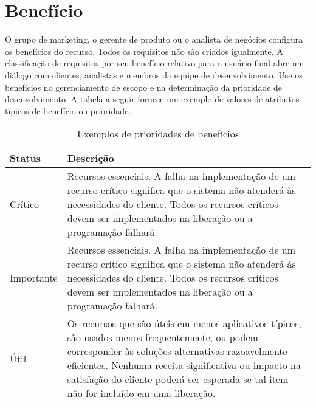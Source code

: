 \documentclass{report}
\begin{document}
\section{Benefício}

O grupo de marketing, o gerente de produto ou o analista de negócios configura os benefícios do recurso. Todos os requisitos não são criados igualmente. A classificação de requisitos por seu benefício relativo para o usuário final abre um diálogo com clientes, analistas e membros da equipe de desenvolvimento. Use os benefícios no gerenciamento de escopo e na determinação da prioridade de desenvolvimento. A tabela a seguir fornece um exemplo de valores de atributos típicos de benefício ou prioridade.

\begin{table}[H]
	\centering

	\begin{tabularx}{\textwidth}{X|X}
		\textbf{Status} & \textbf{Descrição}                                                                                                                                                                                                                                                                                     \\
		\hline
		Crítico         & Recursos essenciais. A falha na implementação de um recurso crítico significa que o sistema não atenderá às necessidades do cliente. Todos os recursos críticos devem ser implementados na liberação ou a programação falhará.                                                                         \\
		Importante      & Recursos essenciais. A falha na implementação de um recurso crítico significa que o sistema não atenderá às necessidades do cliente. Todos os recursos críticos devem ser implementados na liberação ou a programação falhará.                                                                         \\
		Útil            & Os recursos que são úteis em menos aplicativos típicos, são usados menos frequentemente, ou podem corresponder às soluções alternativas razoavelmente eficientes. Nenhuma receita significativa ou impacto na satisfação do cliente poderá ser esperada se tal item não for incluído em uma liberação. \\
		\hline
	\end{tabularx}

	\caption[Prioridades de benefícios]{Exemplos de prioridades de benefícios}
	\label{tab:prioridades}
\end{table}
\end{document}
